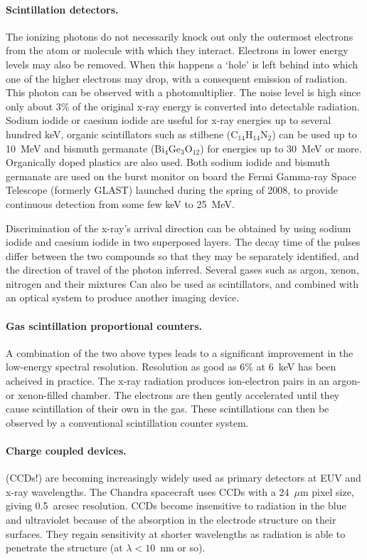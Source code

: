 \documentclass{article}
\begin{document}
\paragraph{Scintillation detectors.} The ionizing photons do not necessarily knock 
out only the outermost electrons from the atom or molecule with which they 
interact. Electrons in lower energy levels may also be removed. When this 
happens a `hole' is left behind into which one of the higher electrons may
drop, with a consequent emission of radiation. This photon can be observed
with a photomultiplier. 
The noise level is high since only about 3\% of the original x-ray energy
is converted into detectable radiation. Sodium iodide or caesium iodide are 
useful for x-ray energies up to several hundred keV, organic scintillators
such as stilbene (C$_{14}$H$_{14}$N$_2$) can be used up to 10~MeV and bismuth
germanate (Bi$_4$Ge$_3$O$_{12}$) for energies up to 30~MeV or more. Organically
doped plastics are also used. Both sodium iodide and bismuth germanate are used
on the burst monitor on board the Fermi Gamma-ray Space Telescope (formerly
GLAST) launched during the spring of 2008, to provide continuous detection
from some few keV to 25~MeV. 

Discrimination of the x-ray's arrival direction can be obtained by using 
sodium iodide and caesium iodide in two superposed layers. The decay time
of the pulses differ between the two compounds so that they may be 
separately identified, and the direction of travel of the photon inferred.
Several gases such as argon, xenon, nitrogen and their mixtures Can also
be used as scintillators, and combined with an optical system to produce
another imaging device.

\paragraph{Gas scintillation proportional counters.} A combination of the two
above types leads to a significant improvement in the low-energy spectral
resolution. Resolution as good as 6\% at 6~keV has been acheived in practice.
The x-ray radiation produces ion-electron pairs in an argon- or xenon-filled
chamber. The electrons are then gently accelerated until they cause 
scintillation of their own in the gas. These scintillations can then be
observed by a conventional scintillation counter system. 

\paragraph{Charge coupled devices.} (CCDs!) are becoming increasingly widely used as 
primary detectors at EUV and x-ray wavelengths. The Chandra spacecraft 
uses CCDs with a 24~$\mu$m pixel size, giving 0.5~arcsec resolution. CCDs
become insensitive to radiation in the blue and ultraviolet because of the 
absorption in the electrode structure on their surfaces. They regain sensitivity at
shorter wavelengths as radiation is able to penetrate the structure
 (at $\lambda<10$~nm or so).
\end{document}

